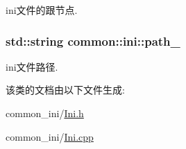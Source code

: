 ini文件的跟节点. 

\hypertarget{classcommon_1_1ini_a4a727d7b5808a36feaead77ac4a39e29}{
\subsubsection[{path\+\_\+}]{\setlength{\rightskip}{0pt plus 5cm}std\+::string common\+::ini\+::path\+\_\+\hspace{0.3cm}{\ttfamily [private]}}}\label{classcommon_1_1ini_a4a727d7b5808a36feaead77ac4a39e29}


ini文件路径. 



该类的文档由以下文件生成\+:\begin{DoxyCompactItemize}
\item 
common\+\_\+ini/\hyperlink{_ini_8h}{Ini.\+h}\item 
common\+\_\+ini/\hyperlink{_ini_8cpp}{Ini.\+cpp}\end{DoxyCompactItemize}
